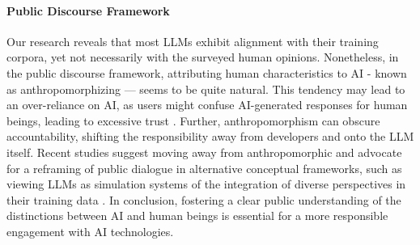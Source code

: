 \paragraph{Public Discourse Framework}
Our research reveals that most LLMs exhibit alignment with their training corpora, yet not necessarily with the surveyed human opinions. Nonetheless, in the public discourse framework, attributing human characteristics to AI - known as anthropomorphizing — seems to be quite natural. 
This tendency may lead to an over-reliance on AI, as users might confuse AI-generated responses for human beings, leading to excessive trust \cite{google_pair_2019}. Further, anthropomorphism can obscure accountability, shifting the responsibility away from developers and onto the LLM itself. Recent studies \cite{mccoy2024embers} suggest moving away from anthropomorphic and advocate for a reframing of public dialogue in alternative conceptual frameworks, such as viewing LLMs as simulation systems of the integration of diverse perspectives in their training data \cite{shanahan2023role}. In conclusion, fostering a clear public understanding of the distinctions between AI and human beings is essential for a more responsible engagement with AI technologies.
